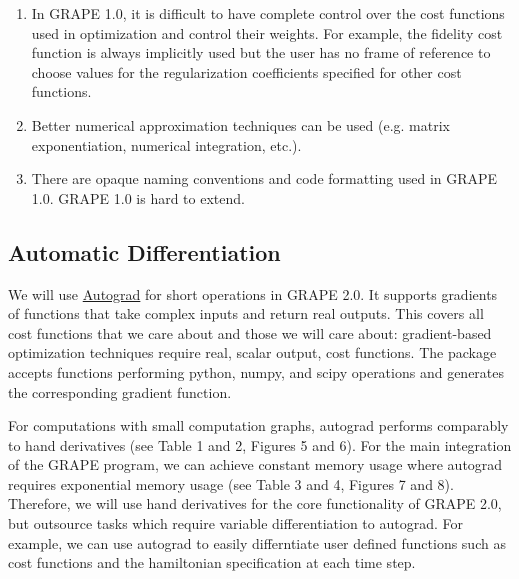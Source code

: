 \documentclass[letterpaper, 12pt]{article}
\begin{document}
\begin{enumerate}
\item In GRAPE 1.0, it is difficult to have complete control over the cost functions used in optimization and control their weights. For example, the fidelity cost function is always implicitly used but the user has no frame of reference to choose values for the regularization coefficients specified for other cost functions.
  
\item Better numerical approximation techniques can be used (e.g. matrix exponentiation, numerical integration, etc.).

\item There are opaque naming conventions and code formatting used in GRAPE 1.0. GRAPE 1.0 is hard to extend.
\end{enumerate}

\subsection{Automatic Differentiation}
We will use \href{https://github.com/HIPS/autograd}{Autograd} \cite{maclaurin2016modeling} for short operations in GRAPE 2.0. It supports gradients of functions that take complex inputs and return real outputs. This covers all cost functions that we care about and those we will care about: gradient-based optimization techniques require real, scalar output, cost functions. The package accepts functions performing python, numpy, and scipy operations and generates the corresponding gradient function.

For computations with small computation graphs, autograd performs comparably to hand derivatives (see Table 1 and 2, Figures 5 and 6). For the main integration of the GRAPE program, we can achieve constant memory usage where autograd requires exponential memory usage (see Table 3 and 4, Figures 7 and 8). Therefore, we will use hand derivatives for the core functionality of GRAPE 2.0, but outsource tasks which require variable differentiation to autograd. For example, we can use autograd to easily differntiate user defined functions such as cost functions and the hamiltonian specification at each time step.
\end{document}
